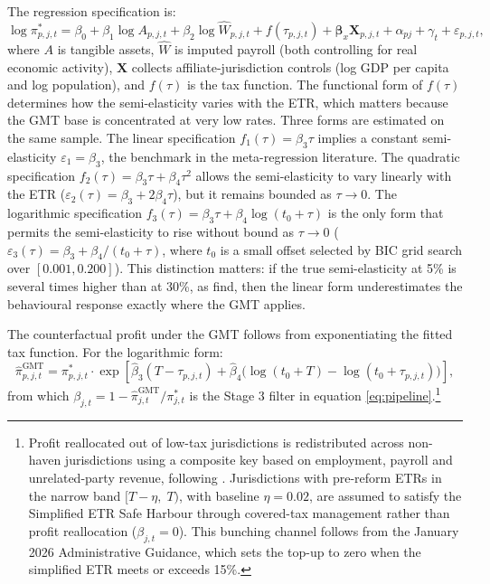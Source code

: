 \documentclass[11pt,a4paper]{article}
\begin{document}
The regression specification is:
\begin{equation}\label{eq:hines}
\log \pi_{p,j,t}^{*} = \beta_0 + \beta_1 \log A_{p,j,t} + \beta_2 \log \hat{W}_{p,j,t} + f(\tau_{p,j,t}) + \boldsymbol{\beta}_x \mathbf{X}_{p,j,t} + \alpha_{pj} + \gamma_t + \varepsilon_{p,j,t},
\end{equation}
where $A$ is tangible assets, $\hat{W}$ is imputed payroll (both controlling for real economic activity), $\mathbf{X}$ collects affiliate-jurisdiction controls (log GDP per capita and log population), and $f(\tau)$ is the tax function. The functional form of $f(\tau)$ determines how the semi-elasticity varies with the ETR, which matters because the GMT base is concentrated at very low rates. Three forms are estimated on the same sample. The linear specification $f_1(\tau) = \beta_3\tau$ implies a constant semi-elasticity $\varepsilon_1 = \beta_3$, the benchmark in the meta-regression literature. The quadratic specification $f_2(\tau) = \beta_3\tau + \beta_4\tau^2$ \citep{dowd2017} allows the semi-elasticity to vary linearly with the ETR ($\varepsilon_2(\tau) = \beta_3 + 2\beta_4\tau$), but it remains bounded as $\tau \to 0$. The logarithmic specification $f_3(\tau) = \beta_3\tau + \beta_4\log(t_0+\tau)$ \citep{garcia-bernardo2024} is the only form that permits the semi-elasticity to rise without bound as $\tau \to 0$ ($\varepsilon_3(\tau) = \beta_3 + \beta_4/(t_0+\tau)$, where $t_0$ is a small offset selected by BIC grid search over $[0.001, 0.200]$). This distinction matters: if the true semi-elasticity at 5\% is several times higher than at 30\%, as \citet{dowd2017} find, then the linear form underestimates the behavioural response exactly where the GMT applies.

The counterfactual profit under the GMT follows from exponentiating the fitted tax function. For the logarithmic form:
\begin{equation}\label{eq:counterfactual}
\hat{\pi}_{p,j,t}^{\text{GMT}} = \pi_{p,j,t}^{*} \cdot \exp\!\left[\hat{\beta}_3 (T - \tau_{p,j,t}) + \hat{\beta}_4 \bigl(\log(t_0 + T) - \log(t_0 + \tau_{p,j,t})\bigr)\right],
\end{equation}
from which $\beta_{j,t} = 1 - \hat{\pi}_{j,t}^{\text{GMT}}/\pi_{j,t}^{*}$ is the Stage 3 filter in equation \eqref{eq:pipeline}.\footnote{Profit reallocated out of low-tax jurisdictions is redistributed across non-haven jurisdictions using a composite key based on employment, payroll and unrelated-party revenue, following \citet{garcia-bernardo2024}. Jurisdictions with pre-reform ETRs in the narrow band $[T - \eta,\; T)$, with baseline $\eta = 0.02$, are assumed to satisfy the Simplified ETR Safe Harbour through covered-tax management rather than profit reallocation ($\beta_{j,t} = 0$). This bunching channel follows from the January 2026 Administrative Guidance, which sets the top-up to zero when the simplified ETR meets or exceeds 15\%.}
\end{document}

